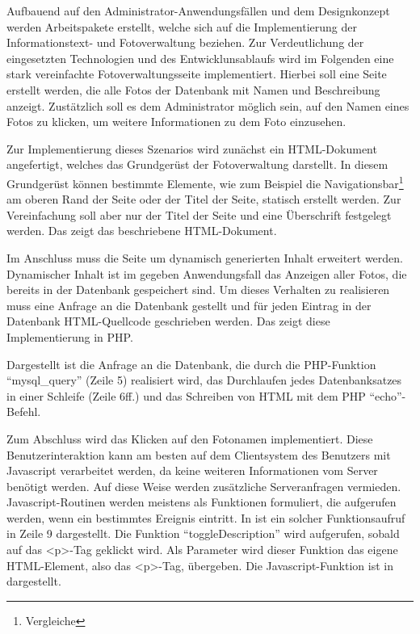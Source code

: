 Aufbauend auf den Administrator-Anwendungsfällen und dem Designkonzept werden
Arbeitspakete erstellt, welche sich auf die Implementierung der
Informationstext- und Fotoverwaltung beziehen. Zur Verdeutlichung der
eingesetzten Technologien und des Entwicklunsablaufs wird im Folgenden eine
stark vereinfachte Fotoverwaltungsseite implementiert. Hierbei soll eine Seite
erstellt werden, die alle Fotos der Datenbank mit Namen und Beschreibung
anzeigt. Zustätzlich soll es dem Administrator möglich sein, auf den Namen eines
Fotos zu klicken, um weitere Informationen zu dem Foto einzusehen.

Zur Implementierung dieses Szenarios wird zunächst ein HTML-Dokument
angefertigt, welches das Grundgerüst der Fotoverwaltung darstellt. In diesem
Grundgerüst können bestimmte Elemente, wie zum Beispiel die
Navigationsbar\footnote{Vergleiche } am oberen Rand der
Seite oder der Titel der Seite, statisch erstellt werden. Zur Vereinfachung soll
aber nur der Titel der Seite und eine Überschrift festgelegt werden. Das
 zeigt das beschriebene HTML-Dokument.



Im Anschluss muss die Seite um dynamisch generierten Inhalt erweitert werden.
Dynamischer Inhalt ist im gegeben Anwendungsfall das Anzeigen aller Fotos, die
bereits in der Datenbank gespeichert sind. Um dieses Verhalten zu realisieren
muss eine Anfrage an die Datenbank gestellt und für jeden Eintrag in der
Datenbank HTML-Quellcode geschrieben werden. Das  zeigt
diese Implementierung in PHP.



Dargestellt ist die Anfrage an die Datenbank, die durch die PHP-Funktion
"`mysql\_query"' (Zeile 5) realisiert wird, das Durchlaufen jedes
Datenbanksatzes in einer Schleife (Zeile 6ff.) und das Schreiben von HTML mit
dem PHP "`echo"'-Befehl.

Zum Abschluss wird das Klicken auf den Fotonamen implementiert. Diese
Benutzerinteraktion kann am besten auf dem Clientsystem des Benutzers
mit Javascript verarbeitet werden, da keine weiteren Informationen vom Server
benötigt werden. Auf diese Weise werden zusätzliche Serveranfragen vermieden.
Javascript-Routinen werden meistens als Funktionen formuliert, die aufgerufen
werden, wenn ein bestimmtes Ereignis eintritt. In  ist
ein solcher Funktionsaufruf in Zeile 9 dargestellt. Die Funktion
"`toggleDescription"' wird aufgerufen, sobald auf das <p>-Tag geklickt wird. Als
Parameter wird dieser Funktion das eigene HTML-Element, also das <p>-Tag,
übergeben. Die Javascript-Funktion ist in 
dargestellt.

